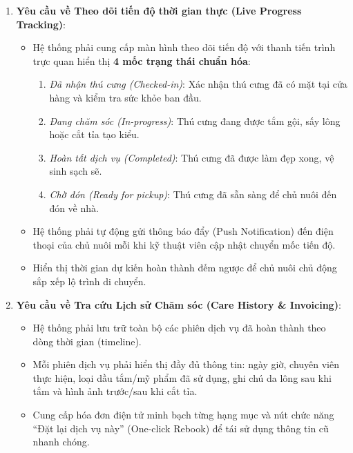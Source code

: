 \begin{enumerate}
    \item \textbf{Yêu cầu về Theo dõi tiến độ thời gian thực (Live Progress Tracking)}:
    \begin{itemize}
        \item Hệ thống phải cung cấp màn hình theo dõi tiến độ với thanh tiến trình trực quan hiển thị \textbf{4 mốc trạng thái chuẩn hóa}:
        \begin{enumerate}
            \item \textit{Đã nhận thú cưng (Checked-in)}: Xác nhận thú cưng đã có mặt tại cửa hàng và kiểm tra sức khỏe ban đầu.
            \item \textit{Đang chăm sóc (In-progress)}: Thú cưng đang được tắm gội, sấy lông hoặc cắt tỉa tạo kiểu.
            \item \textit{Hoàn tất dịch vụ (Completed)}: Thú cưng đã được làm đẹp xong, vệ sinh sạch sẽ.
            \item \textit{Chờ đón (Ready for pickup)}: Thú cưng đã sẵn sàng để chủ nuôi đến đón về nhà.
        \end{enumerate}
        \item Hệ thống phải tự động gửi thông báo đẩy (Push Notification) đến điện thoại của chủ nuôi mỗi khi kỹ thuật viên cập nhật chuyển mốc tiến độ.
        \item Hiển thị thời gian dự kiến hoàn thành đếm ngược để chủ nuôi chủ động sắp xếp lộ trình di chuyển.
    \end{itemize}
    \item \textbf{Yêu cầu về Tra cứu Lịch sử Chăm sóc (Care History \& Invoicing)}:
    \begin{itemize}
        \item Hệ thống phải lưu trữ toàn bộ các phiên dịch vụ đã hoàn thành theo dòng thời gian (timeline).
        \item Mỗi phiên dịch vụ phải hiển thị đầy đủ thông tin: ngày giờ, chuyên viên thực hiện, loại dầu tắm/mỹ phẩm đã sử dụng, ghi chú da lông sau khi tắm và hình ảnh trước/sau khi cắt tỉa.
        \item Cung cấp hóa đơn điện tử minh bạch từng hạng mục và nút chức năng ``Đặt lại dịch vụ này'' (One-click Rebook) để tái sử dụng thông tin cũ nhanh chóng.
    \end{itemize}
\end{enumerate}

